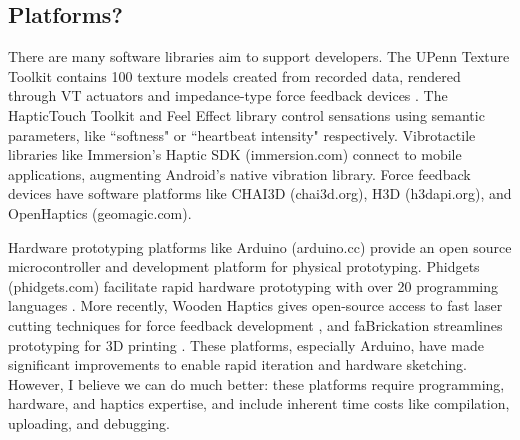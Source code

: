 


\subsection{Platforms?}

There are many software libraries aim to support developers.
The UPenn Texture Toolkit contains 100 texture models created from recorded data, rendered through VT actuators and impedance-type force feedback devices \cite{Culbertson2014}.
The HapticTouch Toolkit \cite{Ledo2012} and Feel Effect library \cite{Israr2014} control sensations using semantic parameters, like ``softness" or ``heartbeat intensity" respectively.
Vibrotactile libraries like Immersion's Haptic SDK (immersion.com) connect to mobile applications, augmenting Android's native vibration library.
Force feedback devices have software platforms like CHAI3D (chai3d.org), H3D (h3dapi.org), and OpenHaptics (geomagic.com). 

Hardware prototyping platforms like
Arduino (arduino.cc) provide an open source microcontroller %
and development platform %
for physical prototyping.
Phidgets (phidgets.com) facilitate rapid hardware prototyping with over 20 programming languages 
\cite{Greenberg2001}.
More recently, Wooden Haptics gives open-source access to fast laser cutting techniques for force feedback development \cite{Forsslund2015}, and
faBrickation streamlines prototyping for 3D printing \cite{Mueller2014}. %
These platforms, especially Arduino, have made significant improvements to enable rapid iteration and hardware sketching.
However, I believe we can do much better: these platforms require programming, hardware, and haptics expertise, and include inherent time costs like compilation, uploading, and debugging.



